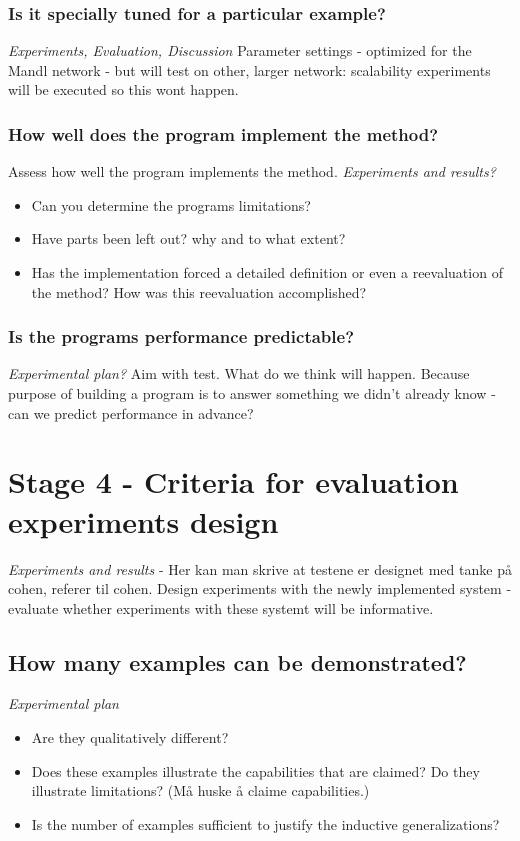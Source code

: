 \subsubsection{Is it specially tuned for a particular example?}
\emph{\color{orange} Experiments, Evaluation, Discussion}
Parameter settings - optimized for the Mandl network - but will test on other, larger network: scalability experiments will be executed so this wont happen.

\subsubsection{How well does the program implement the method?}
Assess how well the program implements the method.
\emph{\color{orange} Experiments and results?}
\begin{itemize}
\item Can you determine the programs limitations?
\item Have parts been left out? why and to what extent?
\item Has the implementation forced a detailed definition or even a reevaluation of the method? How was this reevaluation accomplished?
\end{itemize}

\subsubsection{Is the programs performance predictable?}
\emph{\color{orange} Experimental plan?} Aim with test. What do we think will happen.
Because purpose of building a program is to answer something we didn't already know - can we predict performance in advance?

\section{Stage 4 - Criteria for evaluation experiments design}
\emph{\color{orange} Experiments and results} - Her kan man skrive at testene er designet med tanke på cohen, referer til cohen.
Design experiments with the newly implemented system - evaluate whether experiments with these systemt will be informative. 

\subsection{How many examples can be demonstrated?}
\emph{\color{orange} Experimental plan}
\begin{itemize}
\item Are they qualitatively different?
\item Does these examples illustrate the capabilities that are claimed? Do they illustrate limitations?
(Må huske å claime capabilities.)
\item Is the number of examples sufficient to justify the inductive generalizations?
\end{itemize}
